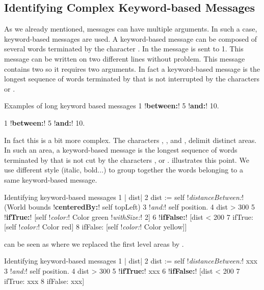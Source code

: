 \documentclass[a4paper,10pt,twoside]{book}
\begin{document}
\subsection{Identifying Complex Keyword-based Messages}

As we already mentioned, messages can have multiple arguments. In such a case, keyword-based messages are used. A keyword-based message can be composed of several words terminated by the character \ct{:}. In  the message  is sent to 1. This message can be written on two different lines without problem. This message contains two \ct{:} so it requires two arguments. In fact a keyword-based message is the longest sequence of words terminated by \ct{:} that is not interrupted by the characters  or \ct{;}.

\begin{script}{Examples of long keyword based messages}\label{scr:longkey}
1 !\textbf{between:}! 5 !\textbf{and:}! 10.

1 !\textbf{between:}! 5
  !\textbf{and:}! 10.
\end{script}

In fact this is a bit more complex. The characters \ct{[}, \ct{]}, and \ct{(}, \ct{)} delimit distinct areas. In such an area, a keyword-based message is the longest sequence  of words terminated by \ct{:} that is not cut by the characters ,  or \ct{;}.   illustrates this point.
We use different style (italic, bold...) to group together the words belonging to a same keyword-based message.

\begin{script}{Identifying keyword-based messages}\label{scr:keywordComplex}
1   | dist|
2   dist := self !\textit{distanceBetween:}! (World bounds !\textbf{centeredBy:}! self topLeft)
3                !\textit{and:}! self position.
4   dist > 300
5      !\textbf{ifTrue:}! [self !\textit{color:}! Color green !\textit{withSize:}! 2]
6      !\textbf{ifFalse:}! [dist < 200
7         ifTrue: [self !\textit{color:}! Color red]
8         ifFalse: [self !\textit{color:}! Color yellow]]
\end{script}

 can be seen as  where we replaced the first level areas by .

\begin{script}{Identifying keyword-based messages}\label{scr:keywordComplex2}
1   | dist|
2   dist := self !\textit{distanceBetween:}! xxx
3                !\textit{and:}! self position.
4   dist > 300
5      !\textbf{ifTrue:}! xxx
6      !\textbf{ifFalse:}! [dist < 200
7         ifTrue: xxx
8         ifFalse: xxx]
\end{script}
\end{document}
